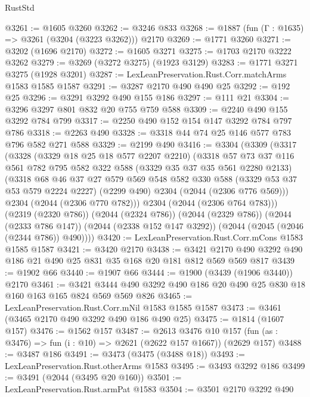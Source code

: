 \begin{lexlean}{RustStd}
\begin{coremodule}
@3261 := @1605 @3260
@3262 := @3246 @833
@3268 := @1887 (fun (Γ : @1635) => @3261 (@3204 (@3223 @3262))) @2170
@3269 := @1771 @3260
@3271 := @3202 (@1696 @2170)
@3272 := @1605 @3271
@3275 := @1703 @2170 @3222 @3262
@3279 := @3269 (@3272 @3275) (@1923 @3129)
@3283 := @1771 @3271 @3275 (@1928 @3201)
@3287 := LexLeanPreservation.Rust.Corr.matchArms @1583 @1585 @1587
@3291 := @3287 @2170 @490 @490 @25
@3292 := @192 @25
@3296 := @3291 @3292 @490 @155 @186
@3297 := @111 @21
@3304 := @3296 @3297 @801 @832 @20 @755 @759 @588
@3309 := @2240 @490 @155 @3292 @784 @799
@3317 := @2250 @490 @152 @154 @147 @3292 @784 @797 @786
@3318 := @2263 @490
@3328 := @3318 @44 @74 @25 @146 @577 @783 @796 @582 @271 @588
@3329 := @2199 @490
@3416 := @3304
    (@3309
      (@3317
        (@3328
          (@3329 @18 @25 @18 @577 @2207 @2210)
          (@3318
            @57
            @73
            @37
            @116
            @561
            @782
            @795
            @582
            @322
            @588
            (@3329 @35 @37 @35 @561 @2280 @2133)
            (@3318
              @68
              @46
              @37
              @27
              @579
              @569
              @548
              @582
              @330
              @588
              (@3329 @53 @37 @53 @579 @2224 @2227)
              (@2299 @490)
              @2304
              (@2044 (@2306 @776 @569)))
            @2304
            (@2044 (@2306 @770 @782)))
          @2304
          (@2044 (@2306 @764 @783)))
        (@2319 (@2320 @786))
        (@2044 (@2324 @786))
        (@2044 (@2329 @786))
        (@2044 (@2333 @786 @147))
        (@2044 (@2338 @152 @147 @3292))
        (@2044 (@2045 (@2046 (@2344 @786)) @490))))
@3420 := LexLeanPreservation.Rust.Corr.mCons @1583 @1585 @1587
@3421 := @3420 @2170
@3438 := @3421 @2170 @490 @3292 @490 @186 @21 @490 @25 @831 @35 @168 @20 @181 @812 @569 @569 @817
@3439 := @1902 @66
@3440 := @1907 @66
@3444 := @1900 (@3439 (@1906 @3440)) @2170
@3461 := @3421 @3444 @490 @3292 @490 @186 @20 @490 @25 @830 @18 @160 @163 @165 @824 @569 @569 @826
@3465 := LexLeanPreservation.Rust.Corr.mNil @1583 @1585 @1587
@3473 := @3461 (@3465 @2170 @490 @3292 @490 @186 @490 @25)
@3475 := @1814 (@1607 @157)
@3476 := @1562 @157
@3487 := @2613
    @3476
    @10
    @157
    (fun (as : @3476) => fun (i : @10) => @2621 (@2622 @157 @1667))
    (@2629 @157)
@3488 := @3487 @186
@3491 := @3473 (@3475 (@3488 @18))
@3493 := LexLeanPreservation.Rust.otherArms @1583
@3495 := @3493 @3292 @186
@3499 := @3491 (@2044 (@3495 @20 @160))
@3501 := LexLeanPreservation.Rust.armPat @1583
@3504 := @3501 @2170 @3292 @490

\end{coremodule}
\end{lexlean}
